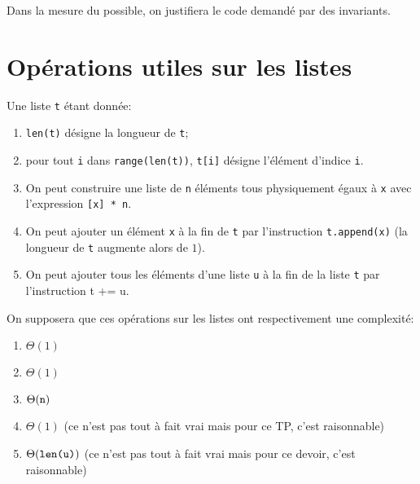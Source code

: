 \ifprof
\else



Dans la mesure du possible, on justifiera le code demandé par des
invariants.


\section{Opérations utiles sur les listes}

Une liste \texttt{t} étant donnée:

\begin{enumerate}
\item \texttt{len(t)} désigne la longueur de \texttt{t};
\item pour tout \texttt{i} dans \texttt{range(len(t))}, \texttt{t[i]} désigne
  l'élément d'indice \texttt{i}.
\item On peut construire une liste de \texttt{n} éléments tous physiquement
  égaux à \texttt{x} avec l'expression \texttt{[x] * n}.
\item On peut ajouter un élément \texttt{x} à la fin de \texttt{t} par
  l'instruction \texttt{t.append(x)} (la longueur de \texttt{t} augmente alors
  de $1$).
\item On peut ajouter tous les éléments d'une liste \texttt{u} à la fin de
  la liste \texttt{t} par l'instruction t += u.
\end{enumerate}

On supposera que ces opérations sur les listes ont respectivement une
complexité:
\begin{enumerate}
\item $\Theta(1)$
\item $\Theta(1)$
\item $\Theta(\text{\texttt{n}})$
\item $\Theta(1)$ (ce n'est pas tout à fait vrai mais pour ce TP,
  c'est raisonnable)
\item $\Theta(\text{\texttt{len(u)}})$ (ce n'est pas tout à fait vrai mais
  pour ce devoir, c'est raisonnable)
\end{enumerate}

